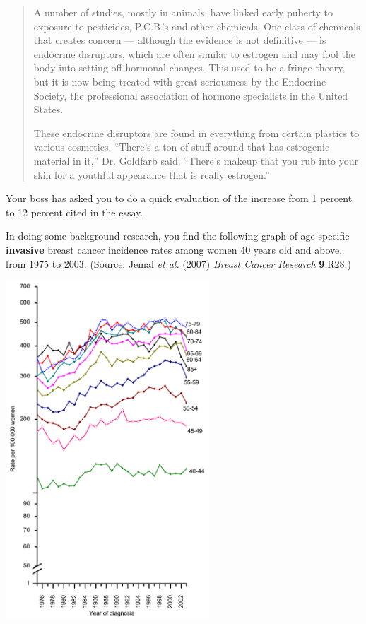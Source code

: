 \begin{quotation}
A number of studies, mostly in animals, have linked early puberty to exposure to pesticides, P.C.B.'s and other chemicals. One class of chemicals that creates concern --- although the evidence is not definitive --- is endocrine disruptors, which are often similar to estrogen and may fool the body into setting off hormonal changes. This used to be a fringe theory, but it is now being treated with great seriousness by the Endocrine Society, the professional association of hormone specialists in the United States.

These endocrine disruptors are found in everything from certain plastics to various cosmetics. ``There's a ton of stuff around that has estrogenic material in it,'' Dr. Goldfarb said. ``There's makeup that you rub into your skin for a youthful appearance that is really estrogen.''
\end{quotation}

Your boss has asked you to do a quick evaluation of the increase from 1 percent to 12 percent cited in the essay.  

In doing some background research, you find the following graph of age-specific {\bf invasive} breast cancer incidence rates among women 40 years old and above, from 1975 to 2003.  (Source: Jemal {\em et al.} (2007) {\em Breast Cancer Research} {\bf 9}:R28.)  

\includegraphics[width=3in]{Individual-Items/bcr1672-1.png}

